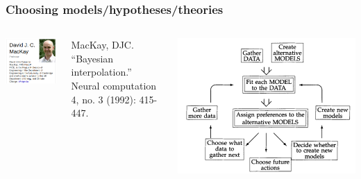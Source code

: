 \documentclass{beamer}
\begin{document}
\begin{frame}
\frametitle{Choosing models/hypotheses/theories}
\begin{columns}[c]
\includegraphics[width=\textwidth]{mackay}
\vspace{.5cm}
{\small
MacKay, DJC. ``Bayesian interpolation.'' Neural computation 4, no. 3 (1992): 415-447.\par}
\includegraphics[width=\textwidth]{mackay1992}
\end{columns}
\end{frame}
\end{document}
